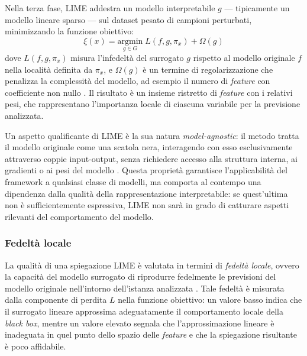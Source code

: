 Nella terza fase, LIME addestra un modello interpretabile $g$ --- tipicamente un modello lineare sparso --- sul dataset pesato di campioni perturbati, minimizzando la funzione obiettivo:
\[
\xi(x) = \underset{g \in G}{\text{argmin}} \; L(f, g, \pi_x) + \Omega(g)
\]
dove $L(f, g, \pi_x)$ misura l'infedeltà del surrogato $g$ rispetto al modello originale $f$ nella località definita da $\pi_x$, e $\Omega(g)$ è un termine di regolarizzazione che penalizza la complessità del modello, ad esempio il numero di \textit{feature} con coefficiente non nullo \cite{ribeiro2016why}. Il risultato è un insieme ristretto di \textit{feature} con i relativi pesi, che rappresentano l'importanza locale di ciascuna variabile per la previsione analizzata.

Un aspetto qualificante di LIME è la sua natura \textit{model-agnostic}: il metodo tratta il modello originale come una scatola nera, interagendo con esso esclusivamente attraverso coppie input-output, senza richiedere accesso alla struttura interna, ai gradienti o ai pesi del modello \cite{ribeiro2016why}. Questa proprietà garantisce l'applicabilità del framework a qualsiasi classe di modelli, ma comporta al contempo una dipendenza dalla qualità della rappresentazione interpretabile: se quest'ultima non è sufficientemente espressiva, LIME non sarà in grado di catturare aspetti rilevanti del comportamento del modello.

\subsubsection{Fedeltà locale}

La qualità di una spiegazione LIME è valutata in termini di \textit{fedeltà locale}, ovvero la capacità del modello surrogato di riprodurre fedelmente le previsioni del modello originale nell'intorno dell'istanza analizzata \cite{molnar2025interpretable}. Tale fedeltà è misurata dalla componente di perdita $L$ nella funzione obiettivo: un valore basso indica che il surrogato lineare approssima adeguatamente il comportamento locale della \textit{black box}, mentre un valore elevato segnala che l'approssimazione lineare è inadeguata in quel punto dello spazio delle \textit{feature} e che la spiegazione risultante è poco affidabile.

